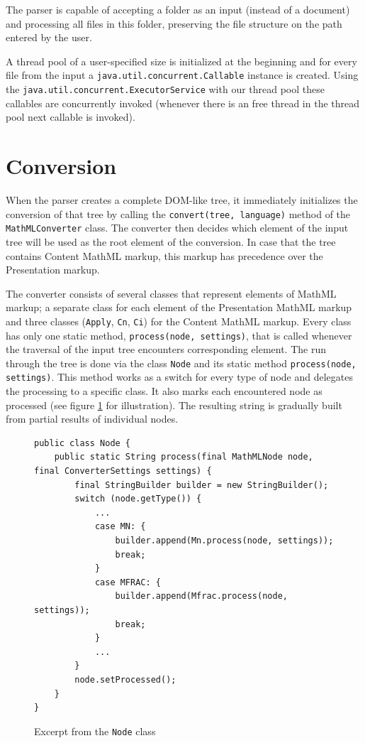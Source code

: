 \documentclass[11pt,oneside,final]{fithesis2}
\begin{document}
The parser is capable of accepting a folder as an input (instead of a document) and processing all files in this folder, preserving the file structure on the path entered by the user. 

A thread pool of a user-specified size is initialized at the beginning and for every file from the input a \texttt{java.util.concurrent.Callable} instance is created. Using the \texttt{java.util.concurrent.ExecutorService} with our thread pool these callables are concurrently invoked (whenever there is an free thread in the thread pool next callable is invoked).  

\section{Conversion}
When the parser creates a complete DOM-like tree, it immediately initializes the conversion of that tree by calling the \texttt{convert(tree, language)} method of the \texttt{MathMLConverter} class. The converter then decides which element of the input tree will be used as the root element of the conversion. In case that the tree contains Content MathML markup, this markup has precedence over the Presentation markup. 

The converter consists of several classes that represent elements of MathML markup; a separate class for each element of the Presentation MathML markup and three classes (\texttt{Apply}, \texttt{Cn}, \texttt{Ci}) for the Content MathML markup. Every class has only one static method, \texttt{process(node, settings)}, that is called whenever the traversal of the input tree encounters corresponding element. The run through the tree is done via the class \texttt{Node} and its static method \texttt{process(node, settings)}. This method works as a switch for every type of node and delegates the processing to a specific class. It also marks each encountered node as processed (see figure \ref{fig:converter-node} for illustration). The resulting string is gradually built from partial results of individual nodes.

\begin{figure}[!ht]
\begin{lstlisting}
public class Node {
	public static String process(final MathMLNode node, final ConverterSettings settings) {
		final StringBuilder builder = new StringBuilder();
        switch (node.getType()) {
            ...
            case MN: {
                builder.append(Mn.process(node, settings));
                break;
            }
            case MFRAC: {    
                builder.append(Mfrac.process(node, settings));
                break;
            }
            ...
        }
        node.setProcessed();
    }    
}
\end{lstlisting}
\caption{Excerpt from the \texttt{Node} class}
\label{fig:converter-node}
\end{figure}
\end{document}
